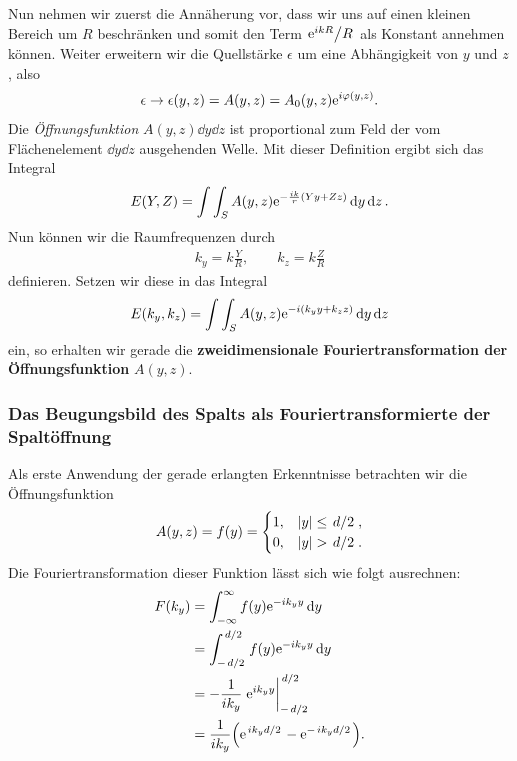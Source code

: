 Nun nehmen wir zuerst die Annäherung vor, dass wir uns auf einen kleinen Bereich um $R$ beschränken und somit den Term $\ffrac{\e{ikR}}{R}$ als Konstant annehmen können. Weiter erweitern wir die Quellstärke $\epsilon$ um eine Abhängigkeit von $y$ und $z$, also
\begin{align}
  \epsilon \to \epsilon(y, z) = A(y,z) = A_0(y, z)\text{e}^{i\varphi(y,z)}.
\end{align}
Die \textit{Öffnungsfunktion} $A(y,z) \dd{y} \dd{z}$ ist proportional zum Feld der vom Flächenelement $\dd{y}\dd{z}$ ausgehenden Welle.  Mit dieser Definition ergibt sich das Integral
\begin{align}
  E(Y,Z) = \int\int_{S} A(y,z) \text{e}^{-\frac{ik}{r}(Yy + Zz)} \dd{y}\dd{z}.
\end{align}
Nun können wir die Raumfrequenzen durch
\begin{align}
  k_y = k\frac{Y}{R}, \qquad k_z = k \frac{Z}{R}
\end{align}
definieren. Setzen wir diese in das Integral
\begin{align}
  E(k_y, k_z) = \int\int_S A(y,z) \text{e}^{-i(k_y y + k_z z)} \dd{y} \dd{z}
\end{align}
ein, so erhalten wir gerade die \textbf{zweidimensionale Fouriertransformation der Öffnungsfunktion} $A(y,z)$.

\subsubsection*{Das Beugungsbild des Spalts als Fouriertransformierte der Spaltöffnung}

Als erste Anwendung der gerade erlangten Erkenntnisse betrachten wir die Öffnungsfunktion
\begin{align}
  A(y,z) = f(y) = \begin{cases}
    1, & |y| \leq \ffrac{d}{2},\\
    0, & |y| > \ffrac{d}{2}.
  \end{cases}
\end{align}
Die Fouriertransformation dieser Funktion lässt sich wie folgt ausrechnen:
\begin{align}
  F(k_y) &= \int_{-\infty}^{\infty} f(y) \e{-ik_y y} \dy\\
          &= \int_{-\ffrac{d}{2}}^{\ffrac{d}{2}} f(y) \e{-ik_y y} \dy\\
          &= -\frac{1}{ik_y} \eval{\e{ik_y y}}_{-\ffrac{d}{2}}^{\ffrac{d}{2}}\\
          &= \frac{1}{ik_y}\qty(\e{\ffrac{ik_yd}{2}} - \e{-\ffrac{ik_yd}{2}}).
\end{align}

